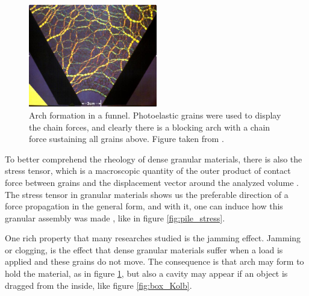 \begin{figure}
    \centering
    \includegraphics[width=0.5\textwidth]{04-figuras/hopperforcechain.jpg}
    \caption{Arch formation in a funnel. Photoelastic grains were used to display the chain forces, and clearly there is a blocking arch with a chain force sustaining all grains above. Figure taken from \cite{Duke_Physics}.}
    \label{fig:arch_chain}
\end{figure}

    To better comprehend the rheology of dense granular materials, there is also the stress tensor, which is a macroscopic quantity of the outer product of contact force between grains and the displacement vector around the analyzed volume \cite{Granular_Physics, Nathalia-Dissertacao, Leticia-Dissertacao, Fabiola-Dissertacao, Force_Chains_Micro_Macro}. The stress tensor in granular materials shows us the preferable direction of a force propagation in the general form, and with it, one can induce how this granular assembly was made \cite{Memories_in_Sand}, like in figure \ref{fig:pile_stress}.

    One rich property that many researches studied \cite{Caio-Tese, Felipe-Tese, Eduardo-Tese, Non-Gaussian_behavior_in_jamming_unjamming_transition_in_dense_granular_materials, Da_Cruz-Tese} is the jamming effect. Jamming or clogging, is the effect that dense granular materials suffer when a load is applied and these grains do not move. The consequence is that arch may form to hold the material, as in figure \ref{fig:arch_chain}, but also a cavity may appear if an object is dragged from the inside, like figure \ref{fig:box_Kolb}.


